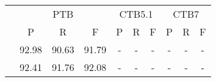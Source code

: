 \begin{table*}[tb]
    \centering
    \begin{tabularx}{\textwidth}{lccccccccc}
        \toprule
                                                        & \multicolumn{3}{c}{PTB}  & \multicolumn{3}{c}{CTB5.1} & \multicolumn{3}{c}{CTB7}                                                                                                                                     \\
                                                        & P                        & R                          & F                        & P                        & R                        & F                        & P              & R              & F              \\
        \midrule
        \cite{stern-etal-2017-minimal}                  & 92.98                    & 90.63                      & 91.79                    & -                        & -                        & -                        & -              & -              & -              \\
        \cite{gaddy-etal-2018-whats}                    & 92.41                    & 91.76                      & 92.08                    & -                        & -                        & -                        & -              & -              & -              \\

\end{tabularx}
\end{table*}
